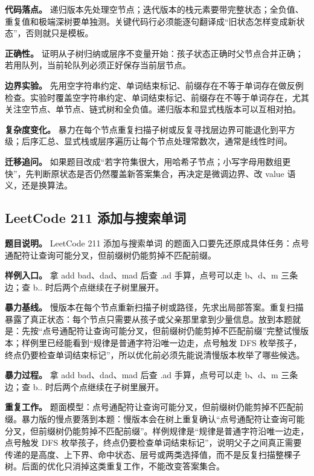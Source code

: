 \textbf{代码落点。} 递归版本先处理空节点；迭代版本的栈元素要带完整状态；全负值、重复值和极端深树要单独测。关键代码行必须能逐句翻译成“旧状态怎样变成新状态”，否则就只是模板。

\textbf{正确性。} 证明从子树归纳或层序不变量开始：孩子状态正确时父节点合并正确；若用队列，当前轮队列必须正好保存当前层节点。

\textbf{边界实验。} 先用空字符串约定、单词结束标记、前缀存在不等于单词存在做反例检查。实验时覆盖空字符串约定、单词结束标记、前缀存在不等于单词存在，尤其关注空节点、单节点、链式树和全负值。递归版本和显式栈版本可以互相对拍。

\textbf{复杂度变化。} 暴力在每个节点重复扫描子树或反复寻找层边界可能退化到平方级；后序汇总、显式栈或层序遍历让每个节点处理常数次，通常是线性时间。

\textbf{迁移追问。} 如果题目改成“若字符集很大，用哈希子节点；小写字母用数组更快”，先判断原状态是否仍然覆盖新答案集合，再决定是微调边界、改 value 语义，还是换算法。

\subsection{LeetCode 211 添加与搜索单词}

\textbf{题目说明。} LeetCode 211 添加与搜索单词 的题面入口要先还原成具体任务：点号通配符让查询可能分叉，但前缀树仍能剪掉不匹配前缀。

\textbf{样例入口。} 拿 add bad、dad、mad 后查 .ad 手算，点号可以走 b、d、m 三条边；查 b.. 时后两个点继续在子树里展开。

\textbf{暴力基线。} 慢版本在每个节点重新扫描子树或路径，先求出局部答案。重复扫描暴露了真正状态：每个节点只需要从孩子或父亲那里拿到少量信息。放到本题就是：先按“点号通配符让查询可能分叉，但前缀树仍能剪掉不匹配前缀”完整试慢版本；样例里已经能看到“规律是普通字符沿唯一边走，点号触发 DFS 枚举孩子，终点仍要检查单词结束标记”，所以优化前必须先能说清慢版本枚举了哪些候选。

\textbf{暴力过程。} 拿 add bad、dad、mad 后查 .ad 手算，点号可以走 b、d、m 三条边；查 b.. 时后两个点继续在子树里展开。

\textbf{重复工作。} 题面模型：点号通配符让查询可能分叉，但前缀树仍能剪掉不匹配前缀。暴力版的慢点要落到本题：慢版本会在树上重复确认“点号通配符让查询可能分叉，但前缀树仍能剪掉不匹配前缀”。样例规律是“规律是普通字符沿唯一边走，点号触发 DFS 枚举孩子，终点仍要检查单词结束标记”，说明父子之间真正需要传递的是高度、上下界、命中状态、层号或两类选择值，而不是反复扫描整棵子树。后面的优化只消掉这类重复工作，不能改变答案集合。

